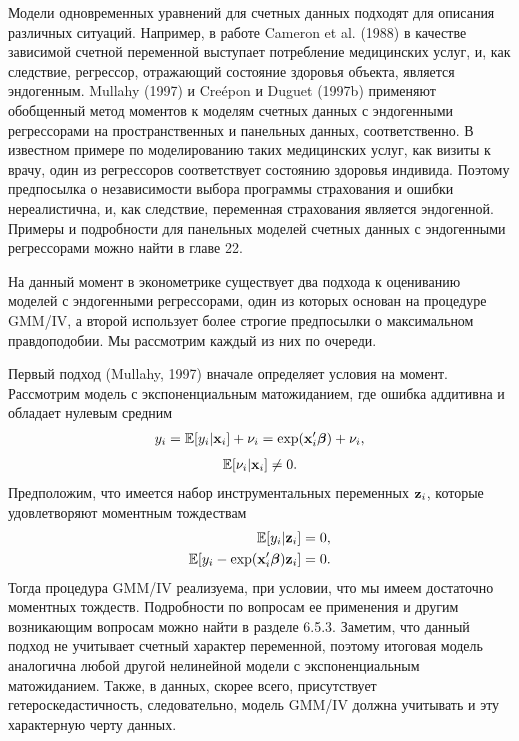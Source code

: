 \noindent
Модели одновременных уравнений для счетных данных подходят для описания различных ситуаций. Например, в работе Cameron et al. (1988) в качестве зависимой счетной переменной выступает потребление медицинских услуг, и, как следствие, регрессор, отражающий состояние здоровья объекта, является эндогенным. Mullahy (1997) и Cre\'epon и Duguet (1997b) применяют обобщенный метод моментов к моделям счетных данных с эндогенными регрессорами на пространственных и панельных данных, соответственно. В известном примере по моделированию таких медицинских услуг, как визиты к врачу, один из регрессоров соответствует состоянию здоровья индивида. Поэтому предпосылка о независимости выбора программы страхования и ошибки нереалистична, и, как следствие, переменная страхования является эндогенной. Примеры и подробности для панельных моделей счетных данных с эндогенными регрессорами можно найти в главе 22.

На данный момент в эконометрике существует два подхода к оцениванию моделей с эндогенными регрессорами, один из которых основан на процедуре GMM/IV, а второй использует более строгие предпосылки о максимальном правдоподобии. Мы рассмотрим каждый из них по очереди.

Первый подход (Mullahy, 1997) вначале определяет условия на момент. Рассмотрим модель с экспоненциальным матожиданием, где ошибка аддитивна и обладает нулевым средним
    \begin{align}\label{eq:20.26}
    y_i = \mathbb{E}[y_i|\mathbf{x}_i] + \nu_i = \exp(\mathbf{x}_i'\bm{\beta}) + \nu_i,
    \end{align}
    \begin{align}\label{eq:20.27}
    \mathbb{E}[\nu_i|\mathbf{x}_i] \ne 0.
    \end{align}
Предположим, что имеется набор инструментальных переменных $\mathbf{z}_i$, которые удовлетворяют моментным тождествам
    \begin{align}\label{eq:20.28}
    \mathbb{E}[y_i|\mathbf{z}_i]    &= 0, \\
    \mathbb{E}[y_i - \exp(\mathbf{x}_i'\bm{\beta})\mathbf{z}_i] &= 0. \notag
    \end{align}
Тогда процедура GMM/IV реализуема, при условии, что мы имеем достаточно моментных тождеств. Подробности по вопросам ее применения и другим возникающим вопросам можно найти в разделе 6.5.3. Заметим, что данный подход не учитывает счетный характер переменной, поэтому итоговая модель аналогична любой другой нелинейной модели с экспоненциальным матожиданием. Также, в данных, скорее всего, присутствует гетероскедастичность, следовательно, модель GMM/IV должна учитывать и эту характерную черту данных.

